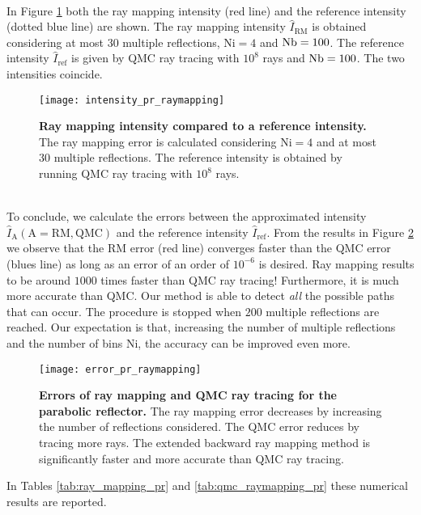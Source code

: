 \\ \indent In Figure \ref{fig:intensity_pr_raymapping} both the ray mapping intensity (red line) and the reference intensity (dotted blue line) are shown. The ray mapping intensity $\hat{I}_{\textrm{RM}}$ is obtained considering at most $30$ multiple reflections, $\textrm{Ni}=4$ and $\textrm{Nb} = 100$. The reference intensity $\hat{I}_{\textrm{ref}}$ is given by QMC ray tracing with $10^8$ rays and $\textrm{Nb} = 100$. The two intensities coincide.
\begin{figure}[t]
  \begin{center}
  \texttt{[image: intensity\_pr\_raymapping]}
  \end{center}
  \caption{\textbf{Ray mapping intensity compared to a reference intensity.}
The ray mapping error is calculated considering $\textrm{Ni}=4$ and at most $30$ multiple reflections. The reference intensity is obtained by running QMC ray tracing with $10^8$ rays.}
\label{fig:intensity_pr_raymapping}
 \end{figure}
\\ \indent
To conclude, we calculate the errors between the approximated intensity $\hat{I}_{\textrm{A}} (\textrm{A}=\textrm{RM}, \textrm{QMC})$ and the reference intensity $\hat{I}_{\textrm{ref}}$. From the results in Figure \ref{fig:error_raymapping_pr} we observe that the RM error (red line) converges faster than the QMC error (blues line) as long as an error of an order of $10^{-6}$ is desired. Ray mapping results to be around $1000$ times faster than QMC ray tracing! Furthermore, it is much more accurate than QMC. Our method is able to detect \textit{all} the possible paths that can occur. The procedure is stopped when $200$ multiple reflections are reached. Our expectation is that, increasing the number of multiple reflections and the number of bins $\textrm{Ni}$, the accuracy can be improved even more.
\begin{figure}[h]
  \begin{center}
  \texttt{[image: error\_pr\_raymapping]}
  \end{center}
  \caption{\textbf{Errors of ray mapping and QMC ray tracing for the parabolic reflector.}
The ray mapping error decreases by increasing the number of reflections considered.
The QMC error reduces by tracing more rays.
 The extended backward ray mapping method is significantly faster and more accurate than QMC ray tracing.}
\label{fig:error_raymapping_pr}
 \end{figure}
In Tables \ref{tab:ray_mapping_pr} and \ref{tab:qmc_raymapping_pr} these numerical results are reported.

